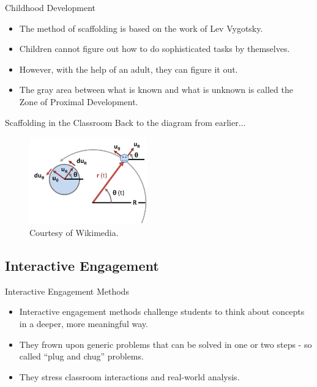 \documentclass{beamer}
\begin{document}
\begin{frame}{Childhood Development}
\begin{itemize}
\item The method of scaffolding is based on the work of Lev Vygotsky.
\item Children cannot figure out how to do sophisticated tasks by themselves.
\item However, with the help of an adult, they can figure it out.
\item The gray area between what is known and what is unknown is called the Zone of Proximal Development.
\end{itemize}
\end{frame}

\begin{frame}{Scaffolding in the Classroom}
Back to the diagram from earlier...
\vspace{5mm}
  \begin{figure}
  \centering
    \includegraphics[width=2in]{img/presentation/vectors}
    \caption{Courtesy of Wikimedia.}
  \end{figure}
\end{frame}

\subsection*{Interactive Engagement}

\begin{frame}{Interactive Engagement Methods}
\begin{itemize}
\item Interactive engagement methods challenge students to think about concepts in a deeper, more meaningful way.
\item They frown upon generic problems that can be solved in one or two steps - so called ``plug and chug'' problems. 
\item They stress classroom interactions and real-world analysis.
\end{itemize}
\end{frame}
\end{document}
